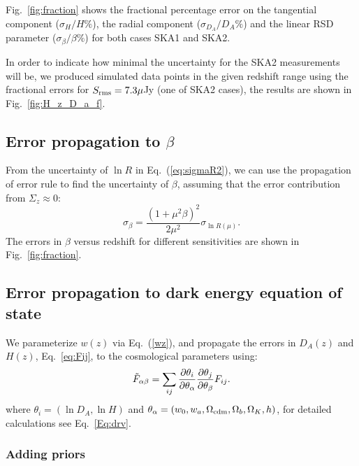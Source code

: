 \documentclass[useAMS,usenatbib]{mn2e}
\begin{document}
Fig.~\ref{fig:fraction} shows the fractional percentage error on the tangential component ($\sigma_H/H \%$), the radial component ($\sigma_{D_A}/D_A \% $) and the  linear RSD parameter ($\sigma_\beta/ \beta \%$) for both cases SKA1 and SKA2. 

In order to indicate how minimal  the uncertainty for the SKA2 measurements will be, we produced  simulated data points in the given  redshift range using the fractional errors for $S_{\rm rms}= 7.3 \mu$Jy (one of SKA2 cases), the results are shown in Fig.~\ref{fig:H_z_D_a_f}. 


\subsection{Error propagation to  $\beta$}

From the uncertainty of $\ln R$ in Eq.~(\ref{eq:sigmaR2}), we can use the propagation of error rule to find the uncertainty of $\beta$, assuming that the error contribution from $\Sigma_z \approx 0$:
\begin{equation}
\sigma_\beta  = \frac{(1+\mu^2 \beta)^{2}}{2 \mu^2} \sigma_{ \ln R(\mu)} .
\end{equation}
The errors in $\beta$  versus redshift for different sensitivities  are shown in Fig.~\ref{fig:fraction}.

 \subsection{Error propagation to dark energy equation of state}
\label{sec:darkenergy}

We parameterize $w(z)$ via Eq.~(\ref{wz}), and
propagate the errors in $D_A(z)$ and $H(z)$, Eq.~\ref{eq:Fij}, to the cosmological parameters using:
\begin{equation}
\tilde{F}_{\alpha\beta}=\sum_{ij}{\partial \theta_i\over \partial \theta_\alpha}{\partial \theta_j\over \partial \theta_\beta}F_{ij}.
\end{equation}
where $\theta_i=(\ln D_A, \ln H)$ and $\theta_\alpha=(w_0,w_a,\Omega_{\rm cdm}, \Omega_b, \Omega_K, h)$, for detailed calculations see Eq.~\ref{Eq:drv}. 

\subsubsection{ Adding priors}
\end{document}

